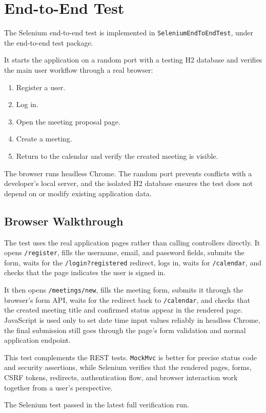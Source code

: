 \chapter{End-to-End Test} \label{cap:endtoend}

The Selenium end-to-end test is implemented in \texttt{SeleniumEndToEndTest}, under the end-to-end test package.

It starts the application on a random port with a testing H2 database and verifies the main user workflow through a real browser:

\begin{enumerate}
\item Register a user.
\item Log in.
\item Open the meeting proposal page.
\item Create a meeting.
\item Return to the calendar and verify the created meeting is visible.
\end{enumerate}

The browser runs headless Chrome. The random port prevents conflicts with a developer's local server, and the isolated H2 database ensures the test does not depend on or modify existing application data.

\section{Browser Walkthrough}

The test uses the real application pages rather than calling controllers directly. It opens \texttt{/register}, fills the username, email, and password fields, submits the form, waits for the \texttt{/login?registered} redirect, logs in, waits for \texttt{/calendar}, and checks that the page indicates the user is signed in.

It then opens \texttt{/meetings/new}, fills the meeting form, submits it through the browser's form API, waits for the redirect back to \texttt{/calendar}, and checks that the created meeting title and confirmed status appear in the rendered page. JavaScript is used only to set date time input values reliably in headless Chrome, the final submission still goes through the page's form validation and normal application endpoint.

This test complements the REST tests. \texttt{MockMvc} is better for precise status code and security assertions, while Selenium verifies that the rendered pages, forms, CSRF tokens, redirects, authentication flow, and browser interaction work together from a user's perspective.

The Selenium test passed in the latest full verification run.
